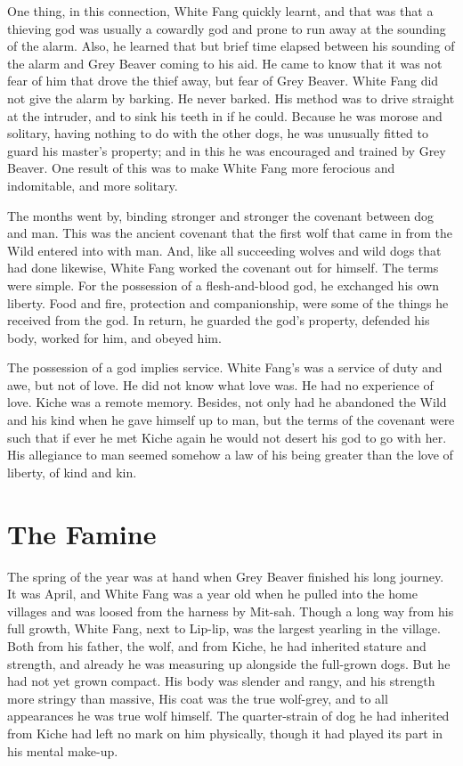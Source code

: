 \documentclass[10pt]{book}
\begin{document}
One thing, in this connection, White Fang quickly learnt, and that was
that a thieving god was usually a cowardly god and prone to run away at
the sounding of the alarm. Also, he learned that but brief time elapsed
between his sounding of the alarm and Grey Beaver coming to his aid. He
came to know that it was not fear of him that drove the thief away, but
fear of Grey Beaver. White Fang did not give the alarm by barking. He
never barked. His method was to drive straight at the intruder, and to
sink his teeth in if he could. Because he was morose and solitary,
having nothing to do with the other dogs, he was unusually fitted to
guard his master’s property; and in this he was encouraged and trained
by Grey Beaver. One result of this was to make White Fang more
ferocious and indomitable, and more solitary.

The months went by, binding stronger and stronger the covenant between
dog and man. This was the ancient covenant that the first wolf that
came in from the Wild entered into with man. And, like all succeeding
wolves and wild dogs that had done likewise, White Fang worked the
covenant out for himself. The terms were simple. For the possession of
a flesh-and-blood god, he exchanged his own liberty. Food and fire,
protection and companionship, were some of the things he received from
the god. In return, he guarded the god’s property, defended his body,
worked for him, and obeyed him.

The possession of a god implies service. White Fang’s was a service of
duty and awe, but not of love. He did not know what love was. He had no
experience of love. Kiche was a remote memory. Besides, not only had he
abandoned the Wild and his kind when he gave himself up to man, but the
terms of the covenant were such that if ever he met Kiche again he
would not desert his god to go with her. His allegiance to man seemed
somehow a law of his being greater than the love of liberty, of kind
and kin.

\chapter{The Famine}

The spring of the year was at hand when Grey Beaver finished his long
journey. It was April, and White Fang was a year old when he pulled
into the home villages and was loosed from the harness by Mit-sah.
Though a long way from his full growth, White Fang, next to Lip-lip,
was the largest yearling in the village. Both from his father, the
wolf, and from Kiche, he had inherited stature and strength, and
already he was measuring up alongside the full-grown dogs. But he had
not yet grown compact. His body was slender and rangy, and his strength
more stringy than massive, His coat was the true wolf-grey, and to all
appearances he was true wolf himself. The quarter-strain of dog he had
inherited from Kiche had left no mark on him physically, though it had
played its part in his mental make-up.
\end{document}
